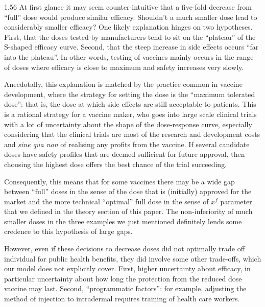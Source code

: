 \documentclass[12pt]{article}
\begin{document}
\begin{spacing}{1.56}
At first glance it may seem counter-intuitive that a five-fold decrease from ``full'' dose would produce similar efficacy. Shouldn't a much smaller dose lead to considerably smaller efficacy? One likely explanation hinges on two hypotheses. First, that the doses tested by manufacturers tend to sit on the ``plateau'' of the S-shaped efficacy curve. Second, that the steep increase in side effects occurs ``far into the plateau''. In other words, testing of vaccines mainly occurs in the range of doses where efficacy is close to maximum and safety increases very slowly. 

Anecdotally, this explanation is matched by the practice common in vaccine development, where the strategy for setting the dose is the ``maximum tolerated dose'': that is, the dose at which side effects are still acceptable to patients. This is a rational strategy for a vaccine maker, who goes into large scale clinical trials with a lot of uncertainty about the shape of the dose-response curve, especially considering that the clinical trials are most of the research and development costs and {\em sine qua non} of realising any profits from the vaccine. If several candidate doses have safety profiles that are deemed sufficient for future approval, then choosing the highest dose offers the best chance of the trial succeeding.

Consequently, this means that for some vaccines there may be a wide gap between ``full'' doses in the sense of the dose that is (initially) approved for the market and the more technical ``optimal'' full dose in the sense of $x^f$ parameter that we defined in the theory section of this paper. The non-inferiority of much smaller doses in the three examples we just mentioned definitely lends some credence to this hypothesis of large gaps.


However, even if these decisions to decrease doses did not optimally trade off individual for public health benefits, they did involve some other trade-offs, which our model does not explicitly cover. First, higher uncertainty about efficacy, in particular uncertainty about how long the protection from the reduced dose vaccine may last. Second, ``programmatic factors'': for example, adjusting the method of injection to intradermal requires training of health care workers.


\end{spacing}
\end{document}
